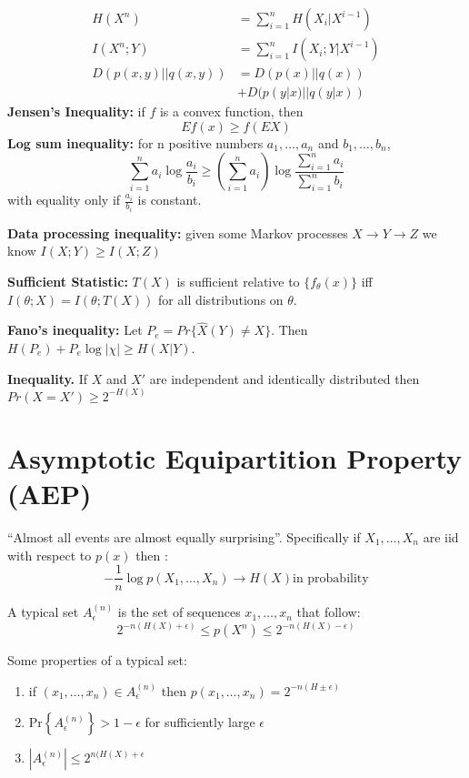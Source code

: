 \documentclass[10pt]{article}
\begin{document}
\begin{tiny}
\begin{multicols}{3}
\begin{align}
H(X^n)&=\sum_{i=1}^n H(X_i|X^{i-1})\\
I(X^n;Y)&=\sum_{i=1}^n I(X_i;Y|X^{i-1})\\
D(p(x,y)||q(x,y))&=D(p(x)||q(x))\\
&+D(p(y|x)||q(y|x))
\end{align}
{\bf Jensen's Inequality:} if $f$ is a convex function, then
\begin{equation}
Ef(x) \geq f(EX)
\end{equation}
{\bf Log sum inequality:} for n positive numbers $a_1,\ldots,a_n$ and $b_1,\ldots,b_n$,
\begin{equation}
\sum_{i=1}^n a_i \log \frac{a_i}{b_i} \geq \left( \sum_{i=1}^n a_i \right) \log \frac{\sum_{i=1}^n a_i}{\sum_{i=1}^n b_i}
\end{equation}
with equality only if $\frac{a_i}{b_i}$ is constant. 

{\bf Data processing inequality:} given some Markov processes $X\rightarrow Y\rightarrow Z$ we know $I(X;Y)\geq I(X;Z)$

{\bf Sufficient Statistic:} $T(X)$ is sufficient relative to $\{f_\theta (x)\}$ iff $I(\theta;X)=I(\theta;T(X))$ for all distributions on $\theta$.

{\bf Fano's inequality:} Let $P_e=Pr\{\hat{X}(Y)\neq X\}$. Then $H(P_e)+P_e \log |\chi| \geq H(X|Y)$.

{\bf Inequality.} If $X$ and $X'$ are independent and identically distributed then $Pr(X=X') \geq 2^{-H(X)}$


\section*{Asymptotic Equipartition Property (AEP)}
``Almost all events are almost equally surprising''. Specifically if $X_1,\ldots,X_n$ are iid with respect to $p(x)$ then :
\begin{equation}
-\frac{1}{n}\log p(X_1,\ldots,X_n)\rightarrow H(X) \text{in probability}
\end{equation}

A typical set $A_\epsilon^{(n)}$ is the set of sequences $x_1,\ldots, x_n$ that follow:
\begin{equation}
2^{-n(H(X)+\epsilon)}\leq p(X^n)\leq 2^{-n(H(X)-\epsilon)}
\end{equation}

Some properties of a typical set:
\begin{enumerate}
\item if $(x_1,\ldots,x_n) \in A_\epsilon^{(n)}$ then $p(x_1,\ldots,x_n) = 2^{-n(H\pm \epsilon)}$
\item Pr$\left\{A_\epsilon^{(n)}\right\}>1-\epsilon$ for sufficiently large $\epsilon$
\item $|A_\epsilon^{(n)}| \leq 2^{n(H(X)+\epsilon}$
\end{enumerate}


\end{multicols}
\end{tiny}
\end{document}
